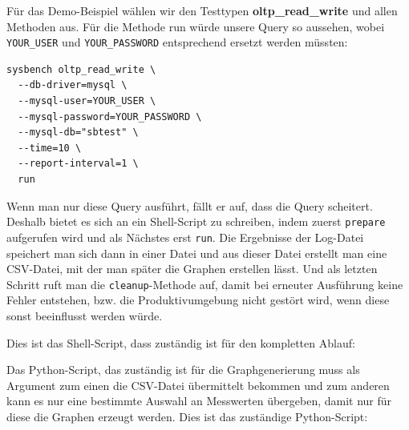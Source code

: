 Für das Demo-Beispiel wählen wir den Testtypen \textbf{oltp\_read\_write} und allen Methoden aus.
Für die Methode run würde unsere Query so aussehen, wobei \texttt{YOUR\_USER} und \texttt{YOUR\_PASSWORD}
entsprechend ersetzt werden müssten:

\begin{lstlisting}[style=custom_daniel,label={lst:sysbenchrun}]
sysbench oltp_read_write \
  --db-driver=mysql \
  --mysql-user=YOUR_USER \
  --mysql-password=YOUR_PASSWORD \
  --mysql-db="sbtest" \
  --time=10 \
  --report-interval=1 \
  run
\end{lstlisting}

Wenn man nur diese Query ausführt, fällt er auf, dass die Query scheitert. Deshalb bietet es sich an ein Shell-Script
zu schreiben, indem zuerst \texttt{prepare} aufgerufen wird und als Nächstes erst \texttt{run}. Die Ergebnisse der Log-Datei
speichert man sich dann in einer Datei und aus dieser Datei erstellt man eine CSV-Datei, mit der man später die Graphen
erstellen lässt. Und als letzten Schritt ruft man die \texttt{cleanup}-Methode auf, damit bei erneuter Ausführung keine
Fehler entstehen, bzw. die Produktivumgebung nicht gestört wird, wenn diese sonst beeinflusst werden würde.

Dies ist das Shell-Script, dass zuständig ist für den kompletten Ablauf:




Das Python-Script, das zuständig ist für die Graphgenerierung muss als Argument zum einen
die CSV-Datei übermittelt bekommen und zum anderen kann es nur eine bestimmte Auswahl an
Messwerten übergeben, damit nur für diese die Graphen erzeugt werden.
Dies ist das zuständige Python-Script:




